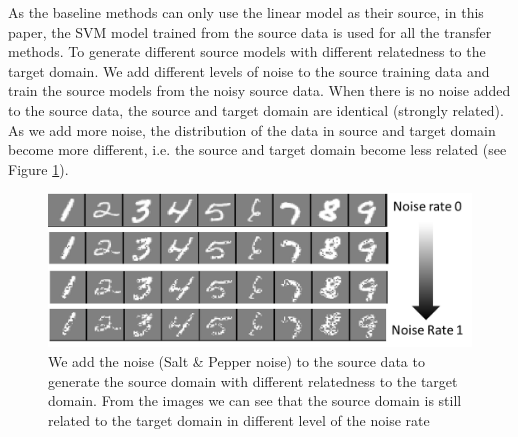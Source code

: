 As the baseline methods can only use the linear model as their source, in this paper, the SVM model trained from the source data is used for all the transfer methods.
To generate different source models with different relatedness to the target domain. We add different levels of noise to the source training data and train the source models from the noisy source data. When there is no noise added to the source data, the source and target domain are identical (strongly related). As we add more noise, the distribution of the data in source and target domain become more different, i.e. the source and target domain become less related (see Figure \ref{fig:noise}). 

\begin{figure}
	\centering
	\includegraphics[scale=0.45]{fig/noise.png}
	\caption{We add the noise (Salt \& Pepper noise) to the source data to generate the source domain with different relatedness to the target domain. From the images we  can see that the source domain is still related to the target domain in different level of the noise rate}\label{fig:noise}
\end{figure}

